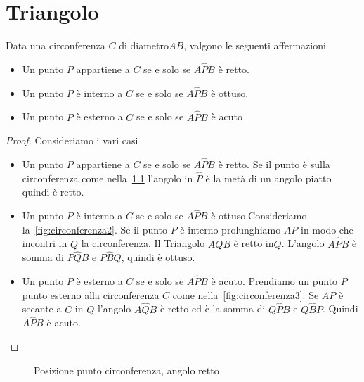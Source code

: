 
\chapter{Triangolo}\label{ch:triangolo}
\begin{thm}\label{thm:Posizione-punto-circonferenza}
Data una circonferenza $C$ di diametro$AB$, valgono le seguenti affermazioni
\begin{itemize}
	\item Un punto $P$ appartiene a $C$ se e solo se $A\hat{P}B$ è retto.
	\item Un punto $P$ è interno a $C$ se e solo se $A\hat{P}B$ è ottuso.
	\item Un punto $P$ è esterno a $C$ se e solo se $A\hat{P}B$ è acuto
\end{itemize}
\end{thm}
\begin{proof} Consideriamo i vari casi\newline
	\begin{itemize}
		\item Un punto $P$ appartiene a $C$ se e solo se $A\hat{P}B$ è retto.\newline
		Se il punto è sulla circonferenza come nella~\cref{fig:circonferenza1} l'angolo in $\hat{P}$ è la metà di un angolo piatto quindi è retto. 
		\item Un punto $P$ è interno a $C$ se e solo se $A\hat{P}B$ è ottuso.\newline Consideriamo la~\cref{fig:circonferenza2}. Se il punto $P$ è interno prolunghiamo $AP$ in modo che incontri in $Q$ la circonferenza. Il Triangolo $AQB$ è retto in$Q$. L'angolo $A\hat{P}B$ è somma di $P\hat{Q}B$ e $P\hat{B}Q$, quindi è ottuso.
		\item Un punto $P$ è esterno a $C$  se e solo se $A\hat{P}B$ è acuto.\newline
		Prendiamo un punto $P$ punto esterno alla circonferenza $C$ come nella~\cref{fig:circonferenza3}. Se $AP$ è secante a $C$ in  $Q$ l'angolo $A\hat{Q}B$ è retto ed è la somma di $Q\hat{P}B$ e $Q\hat{B}P$. Quindi $A\hat{P}B$ è acuto.
	\end{itemize}
\end{proof}
\begin{figure}
	\centering
	
	\caption{Posizione punto circonferenza, angolo retto}
	\label{fig:circonferenza1}
\end{figure}

